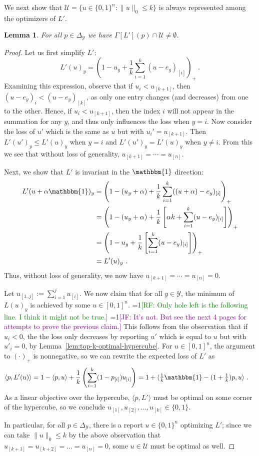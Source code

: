 \documentclass[12pt]{article}
\newcommand{\Comments}{1}
\newcommand{\mynote}[2]{\ifnum\Comments=1\textcolor{#1}{#2}\fi}
\newcommand{\raf}[1]{\mynote{green}{[RF: #1]}}
\newcommand{\jessie}[1]{\mynote{purple}{[JF: #1]}}
\newcommand{\prop}[1]{\Gamma[#1]}
\newcommand{\simplex}{\Delta_\Y}
\newcommand{\U}{\mathcal{U}}
\newcommand{\Y}{\mathcal{Y}}
\newcommand{\inprod}[2]{\langle #1, #2 \rangle}%
\newcommand{\ones}{\mathbbm{1}}
\newtheorem{lemma}{Lemma}
\begin{document}
We next show that $\U = \{u \in \{0,1\}^n : \|u\|_0 \leq k\}$ is always represented among the optimizers of $L'$. \begin{lemma}\label{lem:top-k-optimal-corners}
	For all $p \in \simplex$ we have $\prop{L'}(p) \cap \U \neq \emptyset$.
\end{lemma}
\begin{proof}
	Let us first simplify $L'$:
	\[
	L'(u)_y = \left( 1 - u_y + \frac{1}{k} \sum_{i=1}^k (u - e_y)_{[i]} \right)_+~.
	\]
	Examining this expression, observe that
	if $u_i < u_{[k+1]}$, then $(u-e_y)_i < (u-e_y)_{[k]}$, as only one entry changes (and decreases) from one to the other.
	Hence, if $u_i < u_{[k+1]}$, then the index $i$ will not appear in the summation for any $y$, and thus only influences the loss when $y=i$.
	Now consider the loss of $u'$ which is the same as $u$ but with $u_i' = u_{[k+1]}$.
	Then $L'(u')_y \leq L'(u)_y$ when $y=i$ and $L'(u')_y = L'(u)_y$ when $y\neq i$.
	From this we see that without loss of generality, $u_{[k+1]} = \cdots = u_{[n]}$.
	
	Next, we show that $L'$ is invariant in the $\ones$ direction:
	\begin{align*}
	L'(u + \alpha \ones)_y &= \left( 1 - (u_y + \alpha) + \frac{1}{k} \sum_{i=1}^k ((u + \alpha) - e_y)_{[i]} \right)_+\\
	&= \left( 1 - (u_y + \alpha) + \frac{1}{k}\left[ \alpha k + \sum_{i=1}^k (u - e_y)_{[i]} \right] \right)_+\\
	&= \left( 1 -u_y + \frac{1}{k}\left[ \sum_{i=1}^k (u - e_y)_{[i]} \right] \right)_+\\
	&= L'(u)_y~.
	\end{align*}
	Thus, without loss of generality, we now have $u_{[k+1]} = \cdots = u_{[n]} = 0$.
	
	Let $u_{[1..j]} := \sum_{i=1}^j u_{[i]}$.
	We now claim that for all $y \in \Y$, the minimum of $L(u)_y$ is achieved by some $u \in [0,1]^n$.
	\raf{Only hole left is the following line.  I think it might not be true.} \jessie{It's not.  But see the next 4 pages for attempts to prove the previous claim.}
	This follows from the observation that if $u_i < 0$, the the loss only decreases by reporting $u'$ which is equal to $u$ but with $u'_i = 0$, by Lemma~\ref{lem:top-k-optimal-hypercube}.
	For $u\in[0,1]^n$, the argument to $(\cdot)_+$ is nonnegative, so we can rewrite the expected loss of $L'$ as
	\begin{align*}
	\inprod{p}{L'(u)} &= 1 - \inprod{p}{u} + \frac{1}{k} \left( \sum_{i=1}^k (1 - p_{[i]}) u_{[i]} \right) = 1 + \inprod{\tfrac 1 k \ones - (1+\tfrac 1 k)p}{u}~.
	\end{align*}
	As a linear objective over the hypercube, $\inprod{p}{L'}$ must be optimal on some corner of the hypercube, so we conclude $u_{[1]}, u_{[2]}, \ldots, u_{[k]} \in \{0,1\}$.
	
	In particular, for all $p \in \simplex$, there is a report $u \in \{0,1\}^n$ optimizing $L'$; since we can take $\|u\|_0 \leq k$ by the above observation that $u_{[k+1]} = u_{[k+2]} = \ldots = u_{[n]} = 0$, some $u \in \U$ must be optimal as well.
\end{proof}
\end{document}
